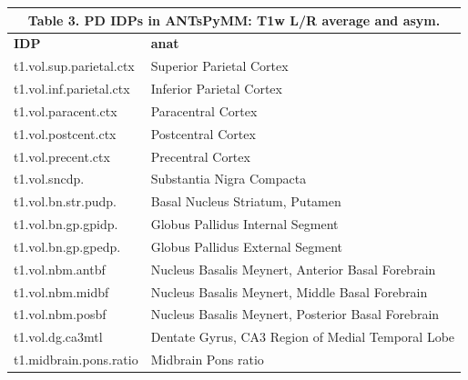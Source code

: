 \documentclass[
  table]{article}
\begin{document}
\begin{small}
\color{black}
\begin{tabular}{ll}
\multicolumn{2}{c}{Table 3. PD IDPs in ANTsPyMM: T1w L/R average and asym.}\\ 
\hline
\textbf{IDP}&\textbf{anat}\\ 
\hline
\cellcolor{platinum}t1.vol.sup.parietal.ctx&\cellcolor{platinum}Superior Parietal Cortex\\ 
t1.vol.inf.parietal.ctx&Inferior Parietal Cortex\\ 
\cellcolor{platinum}t1.vol.paracent.ctx&\cellcolor{platinum}Paracentral Cortex\\ 
t1.vol.postcent.ctx&Postcentral Cortex\\ 
\cellcolor{platinum}t1.vol.precent.ctx&\cellcolor{platinum}Precentral Cortex\\ 
t1.vol.sncdp.&Substantia Nigra Compacta\\ 
\cellcolor{platinum}t1.vol.bn.str.pudp.&\cellcolor{platinum}Basal Nucleus Striatum, Putamen\\ 
t1.vol.bn.gp.gpidp.&Globus Pallidus Internal Segment\\ 
\cellcolor{platinum}t1.vol.bn.gp.gpedp.&\cellcolor{platinum}Globus Pallidus External Segment\\ 
t1.vol.nbm.antbf&Nucleus Basalis Meynert, Anterior Basal Forebrain\\ 
\cellcolor{platinum}t1.vol.nbm.midbf&\cellcolor{platinum}Nucleus Basalis Meynert, Middle Basal Forebrain\\ 
t1.vol.nbm.posbf&Nucleus Basalis Meynert, Posterior Basal Forebrain\\ 
\cellcolor{platinum}t1.vol.dg.ca3mtl&\cellcolor{platinum}Dentate Gyrus, CA3 Region of Medial Temporal Lobe\\ 
t1.midbrain.pons.ratio&Midbrain Pons ratio\\ 
\hline
\end{tabular}
\end{small}
\color{black}
\end{document}

